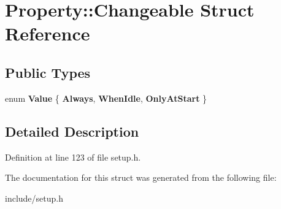 \hypertarget{structProperty_1_1Changeable}{\section{Property\-:\-:Changeable Struct Reference}
\label{structProperty_1_1Changeable}
}
\subsection*{Public Types}
\begin{DoxyCompactItemize}
\item 
enum {\bfseries Value} \{ {\bfseries Always}, 
{\bfseries When\-Idle}, 
{\bfseries Only\-At\-Start}
 \}
\end{DoxyCompactItemize}


\subsection{Detailed Description}


Definition at line 123 of file setup.\-h.



The documentation for this struct was generated from the following file\-:\begin{DoxyCompactItemize}
\item 
include/setup.\-h\end{DoxyCompactItemize}
